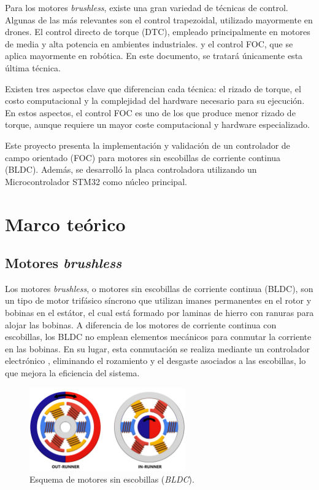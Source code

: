 \documentclass[11pt]{report}
\begin{document}
Para los motores \textit{brushless}, existe una gran variedad de técnicas de control. Algunas de las más relevantes son el control trapezoidal, utilizado mayormente en drones. El control directo de torque (DTC), empleado principalmente en motores de media y alta potencia en ambientes industriales. y el control FOC, que se aplica mayormente en robótica. En este documento, se tratará únicamente esta última técnica.

Existen tres aspectos clave que diferencian cada técnica: el rizado de torque, el costo computacional y la complejidad del hardware necesario para su ejecución. En estos aspectos, el control FOC es uno de los que produce menor rizado de torque, aunque requiere un mayor coste computacional y hardware especializado.

Este proyecto presenta la implementación y validación de un controlador de campo orientado (FOC) para motores sin escobillas de corriente continua (BLDC). Además, se desarrolló la placa controladora utilizando un Microcontrolador STM32 como núcleo principal.

\newpage
\section{Marco teórico}
\subsection{Motores \textit{brushless}}
Los motores \textit{brushless}, o motores sin escobillas de corriente continua (BLDC), son un tipo de motor trifásico síncrono que utilizan imanes permanentes en el rotor y bobinas en el estátor, el cual está formado por laminas de hierro con ranuras para alojar las bobinas. A diferencia de los motores de corriente continua con escobillas, los BLDC no emplean elementos mecánicos para conmutar la corriente en las bobinas. En su lugar, esta conmutación se realiza mediante un controlador electrónico \cite{frick2018bldc}, eliminando el rozamiento y el desgaste asociados a las escobillas, lo que mejora la eficiencia del sistema.

\begin{figure}[ht]
	\centering
	\includegraphics[width=0.6\textwidth]{imagenes/Motor/OUT_IN_BLDC_SF}
	\caption{Esquema de motores sin escobillas (\textit{BLDC}).}
	\label{fig:motor_sin_escobillas}
\end{figure}
\FloatBarrier
\end{document}
